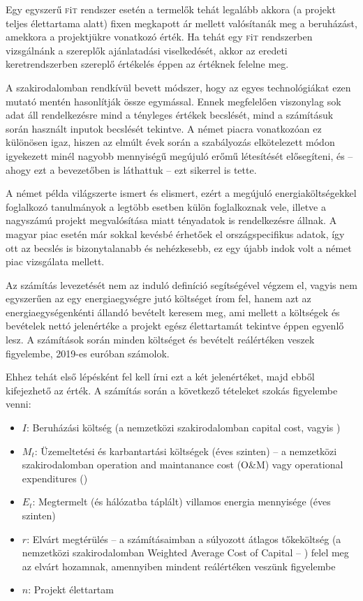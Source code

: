 \documentclass[twoside, magyar, showtrims]{corvinusphd}
\newcommand{\fit}{\textsc{f}i\textsc{t}\index{\textsc{f}i\textsc{t}} }
\begin{document}
Egy egyszerű \fit rendszer esetén a termelők tehát legalább akkora
(a projekt teljes élettartama alatt) fixen megkapott ár
mellett valósítanák meg a beruházást,
amekkora a projektjükre vonatkozó  érték.
Ha tehát egy \fit rendszerben vizsgálnánk
a szereplők ajánlatadási viselkedését,
akkor az eredeti keretrendszerben szereplő értékelés
éppen az  értéknek felelne meg.

A szakirodalomban rendkívül bevett módszer,
hogy az egyes technológiákat
ezen mutató mentén hasonlítják össze egymással.
Ennek megfelelően
viszonylag sok adat áll rendelkezésre mind a tényleges  értékek becslését,
mind a számításuk során használt inputok becslését tekintve.
A német piacra vonatkozóan ez különösen igaz,
hiszen az elmúlt évek során
a szabályozás elkötelezett módon igyekezett minél nagyobb
mennyiségű megújuló erőmű létesítését elősegíteni,
és -- ahogy ezt a bevezetőben is láthattuk -- ezt sikerrel is tette.

A német példa világszerte ismert és elismert,
ezért a megújuló energiaköltségekkel
foglalkozó tanulmányok a legtöbb esetben külön foglalkoznak vele,
illetve a nagyszámú projekt megvalósítása miatt tényadatok is rendelkezésre állnak.
A magyar piac esetén már sokkal kevésbé érhetőek el országspecifikus adatok,
így ott az  becslés is bizonytalanabb és nehézkesebb,
ez egy újabb indok volt a német piac vizsgálata mellett.

Az  számítás levezetését nem
az induló definíció segítségével végzem el,
vagyis nem egyszerűen az egy energiaegységre jutó
költséget írom fel, hanem azt az energiaegységenkénti állandó bevételt
keresem meg, ami mellett a költségek és bevételek nettó jelenértéke
a projekt egész élettartamát tekintve
éppen egyenlő lesz. A számítások során minden 
költséget és bevételt reálértéken veszek figyelembe,
2019-es euróban számolok.

Ehhez tehát első lépésként fel kell írni ezt a két jelenértéket,
majd ebből kifejezhető az  érték.
A számítás során a következő tételeket szokás figyelembe venni:

\begin{itemize}
    \item
        $I$: Beruházási költség (a nemzetközi szakirodalomban capital cost, vagyis )
    \item
   $M_t$: Üzemeltetési és karbantartási költségek (éves szinten) -- a nemzetközi szakirodalomban
operation and maintanance cost (O\&M) vagy operational expenditures ()
    \item
    $E_t$: Megtermelt (és hálózatba táplált) villamos energia mennyisége (éves szinten)
    \item
    $r$: Elvárt megtérülés -- a számításaimban a súlyozott átlagos tőkeköltség (a nemzetközi
szakirodalomban Weighted Average Cost of Capital – ) felel meg az elvárt hozamnak,
amennyiben mindent reálértéken veszünk figyelembe
    \item
    $n$: Projekt élettartam
\end{itemize}
\end{document}
